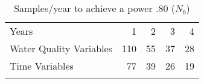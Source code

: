 \begin{table}[htbp]
\caption{Samples/year to achieve a power .80 ($N_b$)}
\begin{center}
\begin{tabular}{lrrrr}
\hline\noalign{\smallskip}
Years & 1 & 2 & 3 & 4 \\ \cline{2-5}\noalign{\smallskip}
Water Quality Variables & 110 & 55 & 37 & 28 \\ 
Time Variables & 77 & 39  & 26  & 19  \\ \hline\noalign{\smallskip}
\end{tabular}
\end{center}
\label{tab:sytaapeighty}
\end{table}